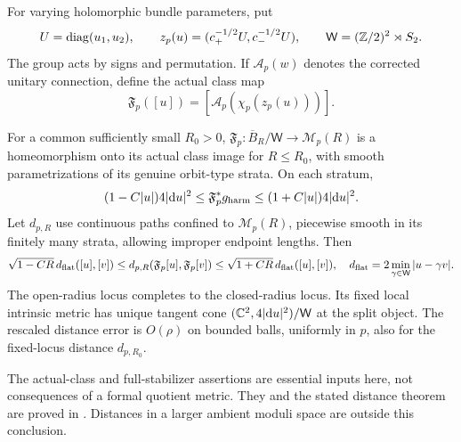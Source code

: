 For varying holomorphic bundle parameters, put
\[
 U=\operatorname{diag}(u_1,u_2),\qquad
 z_p(u)=(c_+^{-1/2}U,c_-^{-1/2}U),\qquad
 \mathsf W=(\mathbb Z/2)^2\rtimes S_2.
\]
The group acts by signs and permutation.
If $\mathcal A_p(w)$ denotes the corrected
unitary connection, define the actual class map
\[
 \mathfrak F_p([u])=[\mathcal A_p(\chi_p(z_p(u)))].
\]
\begin{recollection}\label{thm:moduli-input}
For a common sufficiently small $R_0>0$,
$\mathfrak F_p:\overline B_R/\mathsf W\to\mathcal M_p(R)$
is a homeomorphism onto its actual class image for $R\le R_0$,
with smooth parametrizations of its genuine orbit-type strata.
On each stratum,
\[
 (1-C|u|)4|\mathrm d u|^2\le\mathfrak F_p^*g_{\rm harm}
                              \le(1+C|u|)4|\mathrm d u|^2.
\]
Let $d_{p,R}$ use continuous paths confined to $\mathcal M_p(R)$,
piecewise smooth in its finitely many strata, allowing improper
endpoint lengths. Then
\begin{equation}\label{eq:confined-metric-input}
 \sqrt{1-CR}\,d_{\rm flat}([u],[v])
 \le d_{p,R}(\mathfrak F_p[u],\mathfrak F_p[v])
 \le\sqrt{1+CR}\,d_{\rm flat}([u],[v]),
 \quad d_{\rm flat}=2\min_{\gamma\in\mathsf W}|u-\gamma v|.
\end{equation}
The open-radius locus completes to the closed-radius locus.
Its fixed local intrinsic metric has unique tangent cone
$(\mathbb C^2,4|\mathrm d u|^2)/\mathsf W$ at the split object.
The rescaled distance error is $O(\rho)$ on bounded balls,
uniformly in $p$, also for the fixed-locus distance $d_{p,R_0}$.
\end{recollection}

The actual-class and full-stabilizer assertions are essential
inputs here, not consequences of a formal quotient metric.
They and the stated distance theorem are proved in
\cite[Sections~12--13]{W_HYM}. Distances in a larger ambient
moduli space are outside this conclusion.

